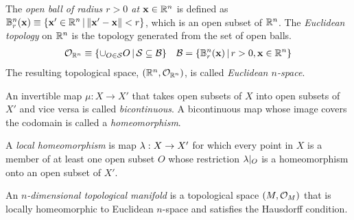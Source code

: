 \documentclass[11pt]{article}
\numberwithin{equation}{section}
\begin{document}
\begin{dfn}
The \textit{open ball of radius $r>0$ at $\mathbf{x}\in\mathbb{R}^n$} is defined as $\mathbb{B}^n_r(\mathbf{x})\equiv\{\mathbf{x}'\in\mathbb{R}^n\,|\,\|\mathbf{x}'-\mathbf{x}\|<r\}$, which is an open subset of $\mathbb{R}^n$.
The \textit{Euclidean topology} on $\mathbb{R}^n$ is the topology generated from the set of open balls.
\begin{align}
  \mathcal{O}_{\mathbb{R}^n}
\equiv
  \{
    \cup_{O\in \mathcal{S}}
    O
  \,|\,
    \mathcal{S}
  \subseteq
    \mathcal{B}
  \}
&&
  \mathcal{B}
=
  \{
    \mathbb{B}^n_r(\mathbf{x})
  \,|\,
    r>0,
    \mathbf{x}\in\mathbb{R}^n
  \}
\end{align}
The resulting topological space, $(\mathbb{R}^n, \mathcal{O}_{\mathbb{R}^n})$, is called \textit{Euclidean $n$-space}.
\end{dfn}


\begin{dfn}
An invertible map $\mu:X\rightarrow X'$ that takes open subsets of $X$ into open subsets of $X'$ and vice versa is called \textit{bicontinuous}.
A bicontinuous map whose image covers the codomain is called a \textit{homeomorphism}.
\end{dfn}

\begin{dfn}
A \textit{local homeomorphism} is map $\lambda :X\rightarrow X'$ for which every point in $X$ is a member of at least one open subset $O$ whose restriction $\lambda |_O$ is a homeomorphism onto an open subset of $X'$.
\end{dfn}

\begin{dfn}
An \textit{$n$-dimensional topological manifold} is a topological space  $(M, \mathcal{O}_M)$ that is locally homeomorphic to Euclidean $n$-space and satisfies the Hausdorff condition.
\end{dfn}

\begin{prop}
\end{prop}
\end{document}
